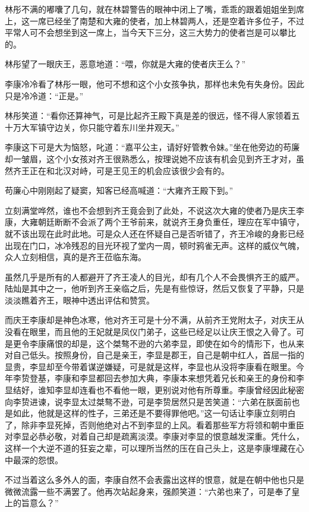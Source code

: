 林彤不满的嘟囔了几句，就在林碧警告的眼神中闭上了嘴，乖乖的跟着姐姐坐到席上，这一席已经坐了南楚和大雍的使者，加上林碧两人，还是空着许多位子，不过平常人可不会想坐到这一席上，当今天下三分，这三大势力的使者岂是可以攀比的。

林彤望了一眼庆王，恶意地道：“喂，你就是大雍的使者庆王么？”

李康冷冷看了林彤一眼，他可不想和这个小女孩争执，那样也未免有失身份。因此只是冷冷道：“正是。”

林彤笑道：“看你还算神气，可是比起齐王殿下真是差的很远，怪不得人家领着五十万大军镇守边关，你只能守着东川坐井观天。”

李康这下可是大为恼怒，叱道：“嘉平公主，请好好管教令妹。”坐在他旁边的苟廉却一皱眉，这个小女孩对齐王很熟悉么，按理说她不应该有机会见到齐王才对，虽然齐王正在和北汉对峙，可是王见王的机会应该很少会有的。

苟廉心中刚刚起了疑窦，知客已经高喊道：“大雍齐王殿下到。”

立刻满堂哗然，谁也不会想到齐王竟会到了此处，不说这次大雍的使者乃是庆王李康，大雍朝廷断断不会派了两个王爷前来，就说齐王身负重任，理应在军中镇守，就不该出现在此时此地。可是众人还在怀疑自己是否听错了，齐王冷峻的身影已经出现在门口，冰冷残忍的目光环视了堂内一周，顿时鸦雀无声。这样的威仪气魄，众人立刻相信，真的是齐王莅临东海。

虽然几乎是所有的人都避开了齐王凌人的目光，却有几个人不会畏惧齐王的威严。陆灿是其中之一，他听到齐王亲临之后，先是有些惊讶，然后又恢复了平静，只是淡淡瞧着齐王，眼神中透出评估和赞赏。

而庆王李康却是神色冰寒，他对齐王可是十分不满，从前齐王党附太子，对庆王从没看在眼里，而且他的王妃就是凤仪门弟子，这些已经足以让庆王恨之入骨了。可是更令李康痛恨的却是，这个桀骜不逊的六弟李显，即使在如今的情形下，也从来对自己低头。按照身份，自己是亲王，李显是郡王，自己是朝中红人，首屈一指的显贵，李显却至今带着谋逆嫌疑，可是就是这样，李显也从没将李康看在眼里。今年李贽登基，李康和李显都回去参加大典，李康本来想凭着兄长和亲王的身份和李显结好，谁知李显却连看也不看他一眼，更别说对他有所尊重。李康曾经因此秘密向李贽进谏，说李显太过桀骜不逊，可是李贽居然只是苦笑道：“六弟在朕面前也是如此，他就是这样的性子，三弟还是不要得罪他吧。”这一句话让李康立刻明白了，除非李显死掉，否则他绝对占不到李显的上风。看着那些军方将领和朝中重臣对李显必恭必敬，对着自己却是疏离淡漠。李康对李显的恨意越发深重。凭什么，这样一个大逆不道的狂妄之辈，可以理所当然的压在自己头上，这是李康埋藏在心中最深的怨恨。

不过当着这么多外人的面，李康自然不会表露出这样的恨意，就是在朝中他也只是微微流露一些不满罢了。他再次站起身来，强颜笑道：“六弟也来了，可是奉了皇上的旨意么？”

